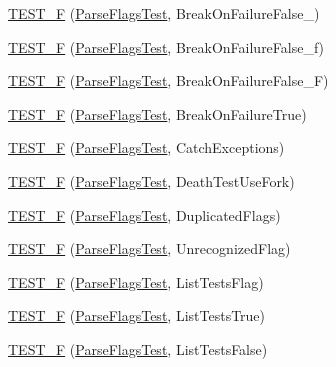 \begin{DoxyCompactItemize}
\item 
\mbox{\hyperlink{namespacetesting_ac5a39f27868bd123d9c5bca03730845e}{T\+E\+S\+T\+\_\+F}} (\mbox{\hyperlink{classtesting_1_1ParseFlagsTest}{Parse\+Flags\+Test}}, Break\+On\+Failure\+False\+\_)
\item 
\mbox{\hyperlink{namespacetesting_afe2c0e1666f3dad816ae5dbdfc37357a}{T\+E\+S\+T\+\_\+F}} (\mbox{\hyperlink{classtesting_1_1ParseFlagsTest}{Parse\+Flags\+Test}}, Break\+On\+Failure\+False\+\_\+f)
\item 
\mbox{\hyperlink{namespacetesting_a92c1ef6a2453eaec5c33bb92dfd3667f}{T\+E\+S\+T\+\_\+F}} (\mbox{\hyperlink{classtesting_1_1ParseFlagsTest}{Parse\+Flags\+Test}}, Break\+On\+Failure\+False\+\_\+F)
\item 
\mbox{\hyperlink{namespacetesting_a2a23ab14983f9e6296149ac711301968}{T\+E\+S\+T\+\_\+F}} (\mbox{\hyperlink{classtesting_1_1ParseFlagsTest}{Parse\+Flags\+Test}}, Break\+On\+Failure\+True)
\item 
\mbox{\hyperlink{namespacetesting_a9e50d6fa46cc314e8d7fa4a829ee6c0d}{T\+E\+S\+T\+\_\+F}} (\mbox{\hyperlink{classtesting_1_1ParseFlagsTest}{Parse\+Flags\+Test}}, Catch\+Exceptions)
\item 
\mbox{\hyperlink{namespacetesting_a767f2b2467c0242492922c205a666e64}{T\+E\+S\+T\+\_\+F}} (\mbox{\hyperlink{classtesting_1_1ParseFlagsTest}{Parse\+Flags\+Test}}, Death\+Test\+Use\+Fork)
\item 
\mbox{\hyperlink{namespacetesting_a76c39020708d7e6646c8aeef149ea827}{T\+E\+S\+T\+\_\+F}} (\mbox{\hyperlink{classtesting_1_1ParseFlagsTest}{Parse\+Flags\+Test}}, Duplicated\+Flags)
\item 
\mbox{\hyperlink{namespacetesting_a876c9749edf7e23132e0b47ad8cfe02c}{T\+E\+S\+T\+\_\+F}} (\mbox{\hyperlink{classtesting_1_1ParseFlagsTest}{Parse\+Flags\+Test}}, Unrecognized\+Flag)
\item 
\mbox{\hyperlink{namespacetesting_a3fb86cb10e61ed9007bd22c5ba3b2c62}{T\+E\+S\+T\+\_\+F}} (\mbox{\hyperlink{classtesting_1_1ParseFlagsTest}{Parse\+Flags\+Test}}, List\+Tests\+Flag)
\item 
\mbox{\hyperlink{namespacetesting_a5ce87a07245c10d86d465cb8db493065}{T\+E\+S\+T\+\_\+F}} (\mbox{\hyperlink{classtesting_1_1ParseFlagsTest}{Parse\+Flags\+Test}}, List\+Tests\+True)
\item 
\mbox{\hyperlink{namespacetesting_a983e3df92745027bf68413ecc09f4198}{T\+E\+S\+T\+\_\+F}} (\mbox{\hyperlink{classtesting_1_1ParseFlagsTest}{Parse\+Flags\+Test}}, List\+Tests\+False)
\item 

\end{DoxyCompactItemize}
